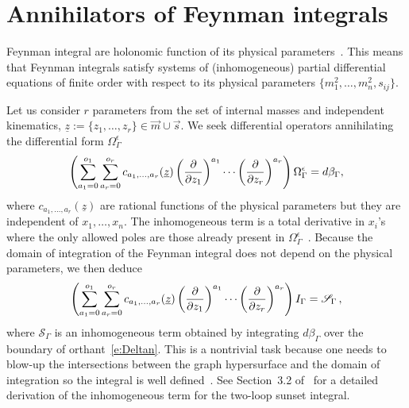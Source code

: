 \documentclass[a4paper,12pt]{article}
\numberwithin{equation}{section}
\numberwithin{figure}{section}
\begin{document}
\section{Annihilators of Feynman integrals}
\label{sec:Red}
Feynman integral are holonomic function of its physical parameters~\cite{Kashiwara:1977nf, Bitoun:2017nre, Smirnov:2010hn,Lee:2013hzt}. This means that Feynman integrals satisfy systems of  (inhomogeneous) partial
differential equations of finite order with respect to its physical parameters
$ \{m_1^2,\dots,m_n^2,s_{ij}\}$.

Let us consider $r$ parameters from the set of internal masses and independent kinematics, $\underline z:=\{z_1,\dots,z_r\} \in \vec m \cup \vec s $. 
%
 We seek 
 differential operators 
annihilating the differential form $\Omega_\Gamma^\epsilon$ 
\begin{equation}\label{e:PFOmegaGeneric}
\left(  \sum_{a_1=0}^{o_1} \sum_{ a_r=0}^{o_r}  c_{a_1,\dots, a_r}(\underline z) \left(\partial\over \partial z_1\right)^{a_1}\cdots\left(\partial
  \over\partial z_r\right)^{a_r}  \right)\Omega_\Gamma^\epsilon=d\beta_\Gamma,
\end{equation}
where $  c_{a_1,\dots, a_r}(\underline z)$ are rational functions of the physical
parameters but they are independent of $x_1,\dots,x_n$. The inhomogeneous term is a total derivative in $x_i$'s where the only allowed poles are those already present in $\Omega_\Gamma^\epsilon$~\cite{Lairez:2022zkj}.
%
Because the domain of integration of the Feynman integral does not
depend on the physical parameters, we then deduce
\begin{equation}\label{e:PDEintFeynman}
  \left( \sum_{a_1=0}^{o_1} \sum_{ a_r=0}^{o_r}  c_{a_1,\dots, a_r}(\underline z) \left(\partial\over \partial z_1\right)^{a_1}\cdots\left(\partial
  \over\partial z_r\right)^{a_r}  \right)I_\Gamma=\mathscr{S}_\Gamma \, ,
\end{equation}
where $\mathscr{S}_\Gamma$ is an inhomogeneous term obtained by
integrating $d\beta_\Gamma$ over the boundary of
orthant~\eqref{e:Deltan}.
This is a nontrivial task because one needs
to blow-up the intersections between the graph hypersurface and the
domain of integration so the integral is well defined~\cite{bek,Brown:2009ta,Bloch:2016izu,muller2014picard}. See
Section~3.2 of~\cite{Bloch:2016izu} for a detailed derivation of the inhomogeneous term for
the two-loop sunset integral.
\end{document}
